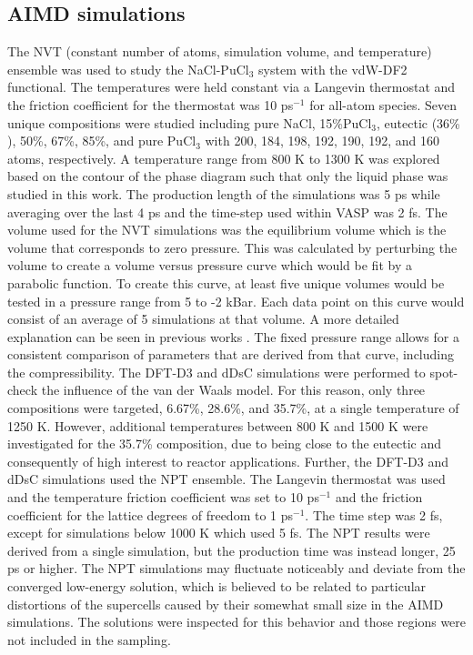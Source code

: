 \documentclass[review]{elsarticle}
\begin{document}
\subsection{AIMD simulations}
The NVT (constant number of atoms, simulation volume, and temperature) ensemble was used to study the NaCl-PuCl$_3$ system with the vdW-DF2 functional. The temperatures were held constant via a Langevin thermostat and the friction coefficient for the thermostat was 10 ps$^{-1}$ for all-atom species. Seven unique compositions were studied including pure NaCl, 15\%PuCl$_3$, eutectic (36\% \cite{bjorklund1959phase, karlsson2022synthesis}), 50\%, 67\%, 85\%, and pure PuCl$_3$ with 200, 184, 198, 192, 190, 192, and 160 atoms, respectively. A temperature range from 800 K to 1300 K was explored based on the contour of the phase diagram such that only the liquid phase was studied in this work. The production length of the simulations was 5 ps while averaging over the last 4 ps and the time-step used within VASP was 2 fs. The volume used for the NVT simulations was the equilibrium volume which is the volume that corresponds to zero pressure. This was calculated by perturbing the volume to create a volume versus pressure curve which would be fit by a parabolic function. To create this curve, at least five unique volumes would be tested in a pressure range from 5 to -2 kBar. Each data point on this curve would consist of an average of 5 simulations at that volume. A more detailed explanation can be seen in previous works \cite{duemmler_liclkcl, duemmler_naclmgcl}. The fixed pressure range allows for a consistent comparison of parameters that are derived from that curve, including the compressibility.
The DFT-D3 and dDsC simulations were performed to spot-check the influence of the van der Waals model. For this reason, only three compositions were targeted, 6.67\%, 28.6\%, and 35.7\%, at a single temperature of 1250 K. However, additional temperatures between 800 K and 1500 K were investigated for the 35.7\% composition, due to being close to the eutectic and consequently of high interest to reactor applications. Further, the DFT-D3 and dDsC simulations used the NPT ensemble. The Langevin thermostat was used and the temperature friction coefficient was set to 10 ps$^{-1}$ and the friction coefficient for the lattice degrees of freedom to 1 ps$^{-1}$. The time step was 2 fs, except for simulations below 1000 K which used 5 fs. The NPT results were derived from a single simulation, but the production time was instead longer, 25 ps or higher. The NPT simulations may fluctuate noticeably and deviate from the converged low-energy solution, which is believed to be related to particular distortions of the supercells caused by their somewhat small size in the AIMD simulations. The solutions were inspected for this behavior and those regions were not included in the sampling. 
\end{document}
